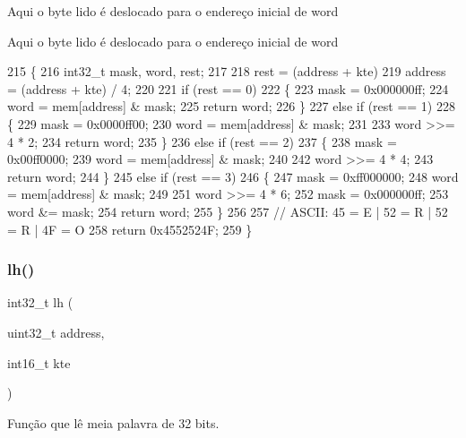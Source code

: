 Aqui o byte lido é deslocado para o endereço inicial de word

Aqui o byte lido é deslocado para o endereço inicial de word 
\begin{DoxyCode}
215 \{
216     int32\_t mask, word, rest;
217 
218     rest = (address + kte) %
219     address = (address + kte) / 4;
220 
221     \textcolor{keywordflow}{if} (rest == 0)
222     \{
223         mask = 0x000000ff;
224         word = mem[address] & mask;
225         \textcolor{keywordflow}{return} word;
226     \}
227     \textcolor{keywordflow}{else} \textcolor{keywordflow}{if} (rest == 1)
228     \{
229         mask = 0x0000ff00;
230         word = mem[address] & mask;
231 
233         word >>= 4 * 2;
234         \textcolor{keywordflow}{return} word;
235     \}
236     \textcolor{keywordflow}{else} \textcolor{keywordflow}{if} (rest == 2)
237     \{
238         mask = 0x00ff0000;
239         word = mem[address] & mask;
240 
242         word >>= 4 * 4;
243         \textcolor{keywordflow}{return} word;
244     \}
245     \textcolor{keywordflow}{else} \textcolor{keywordflow}{if} (rest == 3)
246     \{
247         mask = 0xff000000;
248         word = mem[address] & mask;
249 
251         word >>= 4 * 6;
252         mask = 0x000000ff;
253         word &= mask;
254         \textcolor{keywordflow}{return} word;
255     \}
256 
257     \textcolor{comment}{// ASCII: 45 = E | 52 = R | 52 = R | 4F = O}
258     \textcolor{keywordflow}{return} 0x4552524F;
259 \}
\end{DoxyCode}
\mbox{\label{memory_8h_aa2686cd57bf2dff9ac555939933ebadf}} 
\subsubsection{lh()}
{\footnotesize\ttfamily int32\+\_\+t lh (\begin{DoxyParamCaption}\item[{uint32\+\_\+t}]{address,  }\item[{int16\+\_\+t}]{kte }\end{DoxyParamCaption})}



Função que lê meia palavra de 32 bits. 


